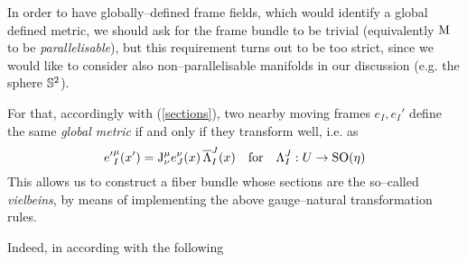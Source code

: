 In order to have globally--defined frame fields, which would identify a global defined metric, we should ask for the frame bundle to be trivial (equivalently $\M$ to be \emph{parallelisable}), but this requirement turns out to be too strict, since we would like to consider also non--parallelisable manifolds in our discussion (e.g. the sphere $\S^2$).

For that, accordingly with (\ref{sections}), two nearby moving frames $e_I,e_I'$ define the same \emph{global metric} if and only if they transform well, i.e. as
$${e'}_I^\mu(x')=\J^\mu_\nu e^\nu_J(x)\,\overline{\Lambda}^J_I(x)\quad\text{for}\quad\Lambda^J_I:U\to\SO(\eta)$$
This allows us to construct a fiber bundle whose sections are the so--called \emph{vielbeins}, by means of implementing the above gauge--natural transformation rules. 

Indeed, in according with the following



